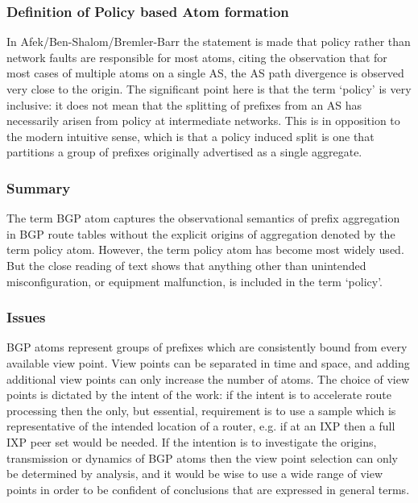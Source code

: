 \subsubsection{Definition of Policy based Atom formation}

In Afek/Ben-Shalom/Bremler-Barr the statement is made that policy rather than network faults are responsible for most atoms, citing the observation that for most cases of multiple atoms on a single AS, the AS path divergence is observed very close to the origin. The significant point here is that the term `policy' is very inclusive: it does not mean that the splitting of prefixes from an AS has necessarily arisen from policy at  intermediate  networks. This is in opposition to the modern intuitive sense, which is that a policy induced split is one that partitions a group of prefixes originally advertised as a single aggregate.

\subsubsection{Summary}

The term  BGP atom  captures the observational semantics of prefix aggregation in BGP route tables without the explicit origins of aggregation denoted by the term  policy atom. However, the term  policy atom  has become most widely used. But the close reading of text shows that anything other than unintended misconfiguration, or equipment malfunction, is included in the term `policy'.

\subsubsection{Issues}

BGP atoms represent groups of prefixes which are consistently bound from every available view point. View points can be separated in time and space, and adding additional view points can only increase the number of atoms. The choice of view points is dictated by the intent of the work: if the intent is to accelerate route processing then the only, but essential, requirement is to use a sample which is representative of the intended location of a router, e.g. if at an IXP then a full IXP peer set would be needed. If the intention is to investigate the origins, transmission or dynamics of BGP atoms then the view point selection can only be determined by analysis, and it would be wise to use a wide range of view points in order to be confident of conclusions that are expressed in general terms.


